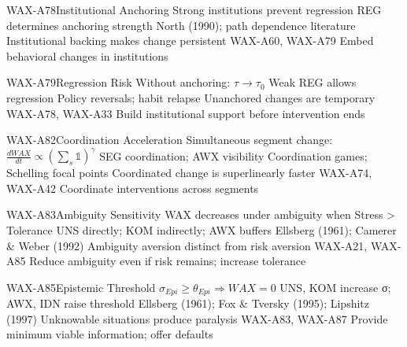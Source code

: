 \begin{axiomspec}{WAX-A78}{Institutional Anchoring}
 Strong institutions prevent regression
 REG determines anchoring strength
 North (1990); path dependence literature
 Institutional backing makes change persistent
 WAX-A60, WAX-A79
 Embed behavioral changes in institutions
\end{axiomspec}

\begin{axiomspec}{WAX-A79}{Regression Risk}
 Without anchoring: $\tau \rightarrow \tau_0$
 Weak REG allows regression
 Policy reversals; habit relapse
 Unanchored changes are temporary
 WAX-A78, WAX-A33
 Build institutional support before intervention ends
\end{axiomspec}

\begin{axiomspec}{WAX-A82}{Coordination Acceleration}
 Simultaneous segment change: $\frac{dWAX}{dt} \propto (\sum_s \mathbb{1})^\gamma$
 SEG coordination; AWX visibility
 Coordination games; Schelling focal points
 Coordinated change is superlinearly faster
 WAX-A74, WAX-A42
 Coordinate interventions across segments
\end{axiomspec}


\begin{axiomspec}{WAX-A83}{Ambiguity Sensitivity}
 WAX decreases under ambiguity when Stress > Tolerance
 UNS directly; KOM indirectly; AWX buffers
 Ellsberg (1961); Camerer \& Weber (1992)
 Ambiguity aversion distinct from risk aversion
 WAX-A21, WAX-A85
 Reduce ambiguity even if risk remains; increase tolerance
\end{axiomspec}

\begin{axiomspec}{WAX-A85}{Epistemic Threshold}
 $\sigma_{Epi} \geq \theta_{Epi} \Rightarrow WAX = 0$
 UNS, KOM increase σ; AWX, IDN raise threshold
 Ellsberg (1961); Fox \& Tversky (1995); Lipshitz (1997)
 Unknowable situations produce paralysis
 WAX-A83, WAX-A87
 Provide minimum viable information; offer defaults
\end{axiomspec}

